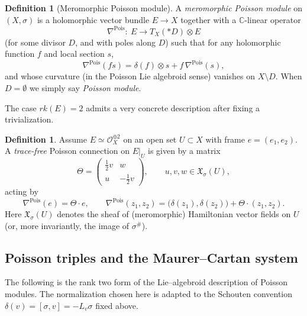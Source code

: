 \documentclass[11pt]{amsart}
\theoremstyle{plain}
\theoremstyle{definition}
\newtheorem{definition}[theorem]{Definition}
\theoremstyle{definition}
\newcommand{\OO}{\mathcal{O}}
\begin{document}
\begin{definition}[Meromorphic Poisson module]
A \emph{meromorphic Poisson module} on $(X,\sigma)$ is a holomorphic vector bundle $E\to X$ together with a
$\mathbb C$-linear operator
$$
\nabla^{\mathrm{Pois}}:\ E\longrightarrow T_X(*D)\otimes E
$$
(for some divisor $D$, and with poles along $D$) such that for any holomorphic function $f$ and local section $s$,
$$
\nabla^{\mathrm{Pois}}(fs)=\delta(f)\otimes s+f\,\nabla^{\mathrm{Pois}}(s),
$$
and whose curvature (in the Poisson Lie algebroid sense) vanishes on $X\setminus D$.
When $D=\emptyset$ we simply say \emph{Poisson module}.
\end{definition}

The case $rk(E)=2$ admits a very concrete description after fixing a trivialization.

\begin{definition} 
Assume $E\simeq \OO_X^{\oplus 2}$ on an open set $U\subset X$ with frame $e=(e_1,e_2)$.
A \emph{trace-free} Poisson connection on $E|_U$ is given by a matrix
$$
\Theta=\begin{pmatrix} \frac12 v & w\\ u & -\frac12 v\end{pmatrix},
\qquad
u,v,w\in \mathfrak X_\sigma(U),
$$
acting by
$$
\nabla^{\mathrm{Pois}}(e)=\Theta\cdot e,
\qquad
\nabla^{\mathrm{Pois}}(z_1,z_2)=\big(\delta(z_1),\delta(z_2)\big)+\Theta\cdot(z_1,z_2).
$$
Here $\mathfrak X_\sigma(U)$ denotes the sheaf of (meromorphic) Hamiltonian vector fields on $U$
(or, more invariantly, the image of $\sigma^\#$).
\end{definition}


\subsection{Poisson triples and the Maurer--Cartan system}

The following is the rank two form of the Lie--algebroid description of Poisson modules.  The normalization
chosen here is adapted to the Schouten convention \(\delta(v)=[\sigma,v]=-L_v\sigma\) fixed above.
\end{document}
